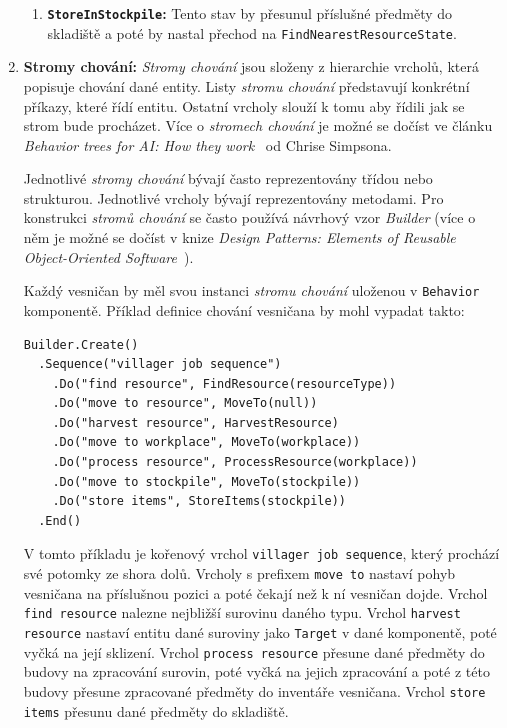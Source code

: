 \begin{enumerate}
\begin{enumerate}
        \item \textbf{\texttt{StoreInStockpile}:} Tento stav by přesunul příslušné předměty do skladiště a poté by nastal přechod na \texttt{FindNearestResourceState}.
    \end{enumerate}

    \item \textbf{Stromy chování:} \textit{Stromy chování} jsou složeny z hierarchie vrcholů, která popisuje chování dané entity. Listy \textit{stromu chování} představují konkrétní příkazy, které řídí entitu. Ostatní vrcholy slouží k tomu aby řídili jak se strom bude procházet. Více o \textit{stromech chování} je možné se dočíst ve článku \textit{Behavior trees for AI: How they work}~\cite{BehaviorTrees} od Chrise Simpsona.

    Jednotlivé \textit{stromy chování} bývají často reprezentovány třídou nebo strukturou. Jednotlivé vrcholy bývají reprezentovány metodami. Pro konstrukci \textit{stromů chování} se často používá návrhový vzor \textit{Builder} (více o něm je možné se dočíst v knize \textit{Design Patterns: Elements of Reusable Object-Oriented Software}~\cite{gamma1994design}).
    
    Každý vesničan by měl svou instanci \textit{stromu chování} uloženou v \texttt{Behavior} komponentě. Příklad definice chování vesničana by mohl vypadat takto:

    \begin{verbatim}
Builder.Create()
  .Sequence("villager job sequence")
    .Do("find resource", FindResource(resourceType))
    .Do("move to resource", MoveTo(null))
    .Do("harvest resource", HarvestResource)
    .Do("move to workplace", MoveTo(workplace))
    .Do("process resource", ProcessResource(workplace))
    .Do("move to stockpile", MoveTo(stockpile))
    .Do("store items", StoreItems(stockpile))
  .End()
    \end{verbatim}

    V tomto příkladu je kořenový vrchol \texttt{villager job sequence}, který prochází své potomky ze shora dolů. Vrcholy s prefixem \texttt{move to} nastaví pohyb vesničana na příslušnou pozici a poté čekají než k ní vesničan dojde. Vrchol \texttt{find resource} nalezne nejbližší surovinu daného typu. Vrchol \texttt{harvest resource} nastaví entitu dané suroviny jako \texttt{Target} v dané komponentě, poté vyčká na její sklizení. Vrchol \texttt{process resource} přesune dané předměty do budovy na zpracování surovin, poté vyčká na jejich zpracování a poté z této budovy přesune zpracované předměty do inventáře vesničana. Vrchol \texttt{store items} přesunu dané předměty do skladiště.
\end{enumerate}

